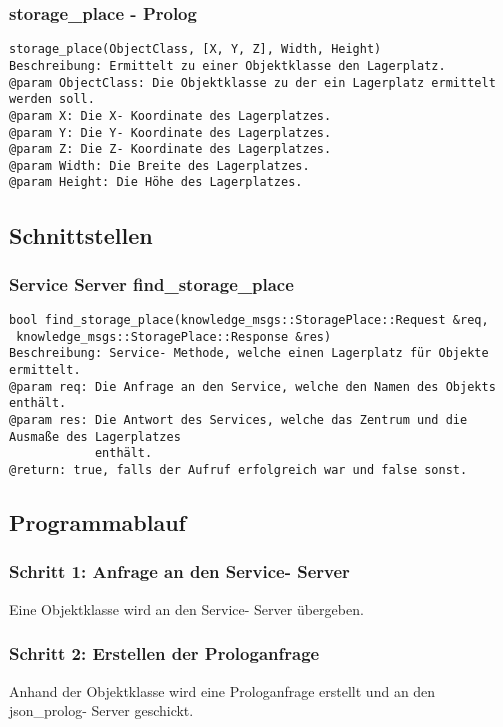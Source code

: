 \documentclass{suturo}
\begin{document}
\subsubsection{storage\_place - Prolog}
\begin{verbatim}
storage_place(ObjectClass, [X, Y, Z], Width, Height)
Beschreibung: Ermittelt zu einer Objektklasse den Lagerplatz.
@param ObjectClass: Die Objektklasse zu der ein Lagerplatz ermittelt werden soll.
@param X: Die X- Koordinate des Lagerplatzes.
@param Y: Die Y- Koordinate des Lagerplatzes.
@param Z: Die Z- Koordinate des Lagerplatzes.
@param Width: Die Breite des Lagerplatzes.
@param Height: Die Höhe des Lagerplatzes.
\end{verbatim}\label{func:estimateplaneindices}

\subsection{Schnittstellen}

\subsubsection{Service Server find\_storage\_place}
\begin{verbatim}
bool find_storage_place(knowledge_msgs::StoragePlace::Request &req,
 knowledge_msgs::StoragePlace::Response &res)
Beschreibung: Service- Methode, welche einen Lagerplatz für Objekte ermittelt.
@param req: Die Anfrage an den Service, welche den Namen des Objekts enthält.  
@param res: Die Antwort des Services, welche das Zentrum und die Ausmaße des Lagerplatzes
            enthält.
@return: true, falls der Aufruf erfolgreich war und false sonst.
\end{verbatim}\label{func:findcluster}

\subsection{Programmablauf}
\subsubsection{Schritt 1: Anfrage an den Service- Server}
Eine Objektklasse wird an den Service- Server übergeben.
\subsubsection{Schritt 2: Erstellen der Prologanfrage}
Anhand der Objektklasse wird eine Prologanfrage erstellt und an den json\_prolog- Server geschickt.
\end{document}
